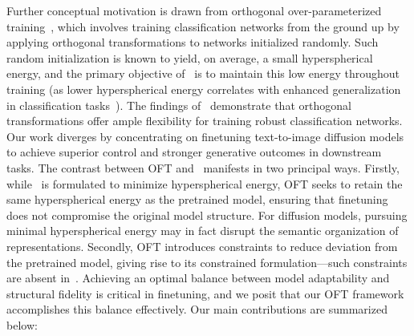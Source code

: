 Further conceptual motivation is drawn from orthogonal over-parameterized training~\cite{liu2021orthogonal}, which involves training classification networks from the ground up by applying orthogonal transformations to networks initialized randomly. Such random initialization is known to yield, on average, a small hyperspherical energy, and the primary objective of~\cite{liu2021orthogonal} is to maintain this low energy throughout training (as lower hyperspherical energy correlates with enhanced generalization in classification tasks~\cite{liu2018learning,lin2020regularizing}). The findings of~\cite{liu2021orthogonal} demonstrate that orthogonal transformations offer ample flexibility for training robust classification networks. Our work diverges by concentrating on finetuning text-to-image diffusion models to achieve superior control and stronger generative outcomes in downstream tasks. The contrast between OFT and~\cite{liu2021orthogonal} manifests in two principal ways. Firstly, while~\cite{liu2021orthogonal} is formulated to minimize hyperspherical energy, OFT seeks to retain the same hyperspherical energy as the pretrained model, ensuring that finetuning does not compromise the original model structure. For diffusion models, pursuing minimal hyperspherical energy may in fact disrupt the semantic organization of representations. Secondly, OFT introduces constraints to reduce deviation from the pretrained model, giving rise to its constrained formulation—such constraints are absent in~\cite{liu2021orthogonal}. Achieving an optimal balance between model adaptability and structural fidelity is critical in finetuning, and we posit that our OFT framework accomplishes this balance effectively. Our main contributions are summarized below:

